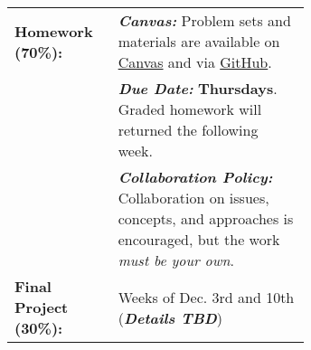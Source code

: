 \begin{tabular}{l p{0.65\linewidth}}
 
\textbf{Homework (70\%):}       &  \emph{\textbf{Canvas:}} Problem sets and materials 
                                   are available on \href{\CanvasURL}{Canvas} and
                                   via \href{\GitHubURL}{GitHub}. \\
                                & \emph{\textbf{Due Date:}} \textbf{Thursdays}. 
                                  Graded homework will returned the following week. \\
                                & \emph{\textbf{Collaboration Policy:}} Collaboration on issues,
                                  concepts, and approaches is encouraged, but the work
                                  \textit{must be your own}.\\

\textbf{Final Project (30\%):}  & Weeks of Dec. 3rd and 10th (\textbf{\it Details TBD}) \\

\end{tabular}